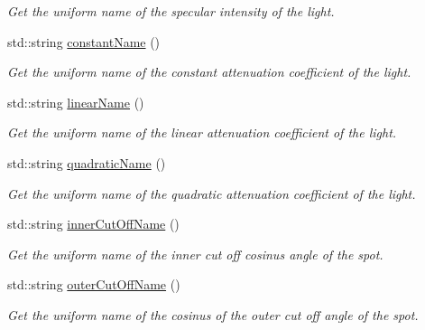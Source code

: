 \begin{DoxyCompactItemize}
\begin{DoxyCompactList}\small\item\em Get the uniform name of the specular intensity of the light. \end{DoxyCompactList}\item 
std\+::string \hyperlink{classSpotLight_aba7db4b7aaf45e77c1719205e9ea55b6}{constant\+Name} ()
\begin{DoxyCompactList}\small\item\em Get the uniform name of the constant attenuation coefficient of the light. \end{DoxyCompactList}\item 
std\+::string \hyperlink{classSpotLight_a7b114e2b107ee726c8b8129e4934f945}{linear\+Name} ()
\begin{DoxyCompactList}\small\item\em Get the uniform name of the linear attenuation coefficient of the light. \end{DoxyCompactList}\item 
std\+::string \hyperlink{classSpotLight_a9882313871fac602139953c9bc5a71a9}{quadratic\+Name} ()
\begin{DoxyCompactList}\small\item\em Get the uniform name of the quadratic attenuation coefficient of the light. \end{DoxyCompactList}\item 
std\+::string \hyperlink{classSpotLight_ab6be95b430231205dbe809ab75e75eda}{inner\+Cut\+Off\+Name} ()
\begin{DoxyCompactList}\small\item\em Get the uniform name of the inner cut off cosinus angle of the spot. \end{DoxyCompactList}\item 
std\+::string \hyperlink{classSpotLight_a043bfff100806a24928e7efd0c5a8b73}{outer\+Cut\+Off\+Name} ()
\begin{DoxyCompactList}\small\item\em Get the uniform name of the cosinus of the outer cut off angle of the spot. \end{DoxyCompactList}\end{DoxyCompactItemize}
